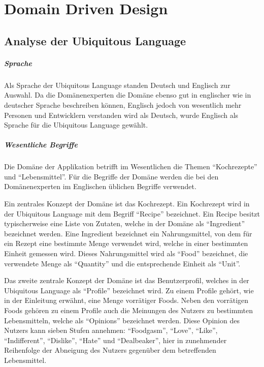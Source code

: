\chapter{Domain Driven Design}

\section{Analyse der Ubiquitous Language}

\paragraph{Sprache} Als Sprache der Ubiquitous Language standen Deutsch und Englisch zur Auswahl. Da die Domänenexperten die Domäne ebenso gut in englischer wie in deutscher Sprache beschreiben können, Englisch jedoch von wesentlich mehr Personen und Entwicklern verstanden wird als Deutsch, wurde Englisch als Sprache für die Ubiquitous Language gewählt.

\paragraph{Wesentliche Begriffe} Die Domäne der Applikation betrifft im Wesentlichen die Themen \enquote{Kochrezepte} und \enquote{Lebensmittel}. Für die Begriffe der Domäne werden die bei den Domänenexperten im Englischen üblichen Begriffe verwendet.

Ein zentrales Konzept der Domäne ist das Kochrezept. Ein Kochrezept wird in der Ubiquitous Language mit dem Begriff \enquote{Recipe} bezeichnet. Ein Recipe besitzt typischerweise eine Liste von Zutaten, welche in der Domäne als \enquote{Ingredient} bezeichnet werden. Eine Ingredient bezeichnet ein Nahrungsmittel, von dem für ein Rezept eine bestimmte Menge verwendet wird, welche in einer bestimmten Einheit gemessen wird. Dieses Nahrungsmittel wird als \enquote{Food} bezeichnet, die verwendete Menge als \enquote{Quantity} und die entsprechende Einheit als \enquote{Unit}.

Das zweite zentrale Konzept der Domäne ist das Benutzerprofil, welches in der Ubiquitous Language als \enquote{Profile} bezeichnet wird. Zu einem Profile gehört, wie in der Einleitung erwähnt, eine Menge vorrätiger Foods. Neben den vorrätigen Foods gehören zu einem Profile auch die Meinungen des Nutzers zu bestimmten Lebensmitteln, welche als \enquote{Opinions} bezeichnet werden. Diese Opinion des Nutzers kann sieben Stufen annehmen: \enquote{Foodgasm}, \enquote{Love}, \enquote{Like}, \enquote{Indifferent}, \enquote{Dislike}, \enquote{Hate} und \enquote{Dealbeaker}, hier in zunehmender Reihenfolge der Abneigung des Nutzers gegenüber dem betreffenden Lebensmittel.

